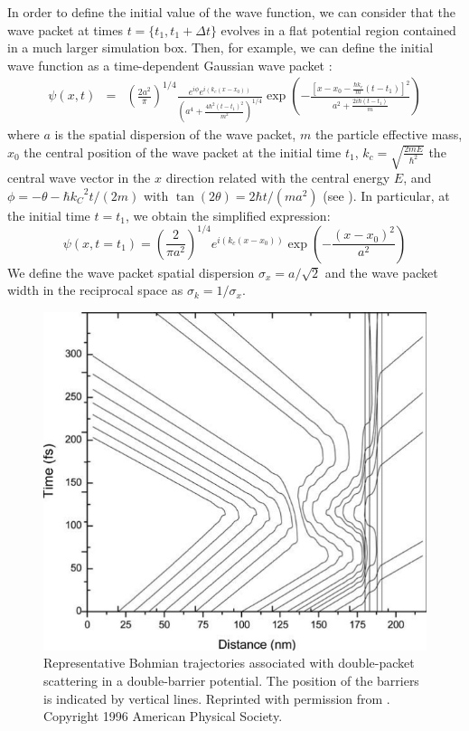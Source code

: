 \documentclass[onecolumn,nofootinbib, secnumarabic, amsmath, nobibnotes,11pt,aps,pra]{revtex4-1}
\begin{document}
In order to define the initial value of the wave function, we can consider that the wave packet at times $t = \{t_1,t_1 + \Delta t\}$ evolves in a flat potential region contained in a much larger simulation box. Then, for example, we can define the  initial wave function as a time-dependent Gaussian wave packet \cite{om.cohen}:
\begin{eqnarray}
\psi (x,t) &=& {{\left( \frac{2{{a}^{2}}}{\pi } \right)}^{1/4}}\frac{{{e}^{i\phi }}{e}^{i(k_c(x-x_0))}}{{{\left( {{a}^{4}} + \frac{4{{\hbar }^{2}}{{(t-{{t}_{1}})}^{2}}}{{{m}^{2}}} \right)}^{1/4}}}\exp \left(-\frac{{{\left[x - {{x}_0} - \frac{\hbar {{k}_{c}}}{m}(t - {{t}_{1}}) \right]}^{2}}}{{{a}^{2}} + \frac{2i\hbar (t - {{t}_{1}})}{m}} \right)
\label{om.finite-difference_innitial}
\end{eqnarray}
where $a$ is the spatial dispersion of the wave packet, $m$ the particle effective mass, $x_0$ the central position of the wave packet at the initial time $t_1$, ${k}_{c} = \sqrt{\frac{2mE}{{\hbar }^{2}}}$ the central wave vector in the $x$ direction related with the central energy $E$, and $\phi = -\theta - {\hbar {k_C}^{2}t}/{(2m)}$ with $\tan (2 \theta ) = {2 \hbar t}/{(m{{a}^{2}})}$ (see \cite{om.cohen}). In particular, at the initial time $t = t_1$, we obtain the simplified expression:
\begin{equation}
\psi (x,t = t_1) = {{\left( \frac{2}{\pi {{a}^{2}}} \right)}^{1/4}}{{e}^{i\left( {{k}_{c}}(x-{{x}_0}) \right)}} \exp \left( -\frac{{{(x-{{x}_0})}^{2}}}{{{a}^{2}}} \right)
\end{equation}
We define the wave packet spatial dispersion ${{\sigma }_{x}} =
a/\sqrt{2}$ and the wave packet width in the reciprocal  space as
${{\sigma }_{k}} = 1/{{\sigma }_{x}}$.


\begin{figure}
\includegraphics{ch1-A1.pdf}
\caption{Representative Bohmian trajectories associated with double-packet scattering in a double-barrier potential. The position of the barriers is indicated by vertical lines. Reprinted with permission from \cite{om.oriolstime}. Copyright 1996 American Physical Society.}
\label{om_fig_twopaq1}
\end{figure}
\end{document}
